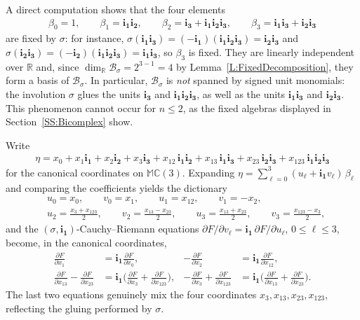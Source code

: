 \documentclass[12pt]{amsart}
\theoremstyle{plain}
\theoremstyle{definition}
\numberwithin{equation}{section}
\newcommand{\im}[1]{\mathbf{ i_{#1}}}
\newcommand{\mC}{\mathbb{C}}
\newcommand{\mR}{\mathbb{R}}
\newcommand{\mM}{\mathbb{M}}
\newcommand{\cB}{\mathcal{B}}
\begin{document}
A direct computation shows that the four elements
    \begin{align*}
    \beta_0 = 1 , \qquad \beta_1 = \im{1}\im{2} , \qquad \beta_2 = \im{3} + \im{1}\im{2}\im{3} , \qquad \beta_3 = \im{1}\im{3} + \im{2}\im{3}
    \end{align*}
are fixed by $\sigma$: for instance, $\sigma (\im{1}\im{3}) = (-\im{1})(\im{1}\im{2}\im{3}) = \im{2}\im{3}$ and $\sigma (\im{2}\im{3}) = (-\im{2})(\im{1}\im{2}\im{3}) = \im{1}\im{3}$, so $\beta_3$ is fixed. They are linearly independent over $\mR$ and, since $\dim_{\mR} \cB_\sigma = 2^{3-1} = 4$ by Lemma~\ref{L:FixedDecomposition}, they form a basis of $\cB_\sigma$. In particular, $\cB_\sigma$ is \emph{not} spanned by signed unit monomials: the involution $\sigma$ glues the units $\im{3}$ and $\im{1}\im{2}\im{3}$, as well as the units $\im{1}\im{3}$ and $\im{2}\im{3}$. This phenomenon cannot occur for $n \leq 2$, as the fixed algebras displayed in Section~\ref{SS:Bicomplex} show.

Write
    \begin{align*}
    \eta = x_0 + x_1 \im{1} + x_2 \im{2} + x_3 \im{3} + x_{12}\, \im{1}\im{2} + x_{13}\, \im{1}\im{3} + x_{23}\, \im{2}\im{3} + x_{123}\, \im{1}\im{2}\im{3}
    \end{align*}
for the canonical coordinates on $\mM \mC(3)$. Expanding $\eta = \sum_{\ell = 0}^{3} (u_\ell + \im{1} v_\ell )\, \beta_\ell$ and comparing the coefficients yields the dictionary
    \begin{align*}
    &u_0 = x_0 , \qquad v_0 = x_1 , \qquad u_1 = x_{12} , \qquad v_1 = - x_2 , \\
    &u_2 = \frac{x_3 + x_{123}}{2} , \qquad v_2 = \frac{x_{13} - x_{23}}{2} , \qquad u_3 = \frac{x_{13} + x_{23}}{2} , \qquad v_3 = \frac{x_{123} - x_3}{2},
    \end{align*}
and the $(\sigma , \im{1})$-Cauchy--Riemann equations $\partial F / \partial v_\ell = \im{1}\, \partial F / \partial u_\ell$, $0 \leq \ell \leq 3$, become, in the canonical coordinates,
    \begin{equation}\label{Eq:TricomplexSystem}
    \begin{aligned}
    \frac{\partial F}{\partial x_1} &= \im{1} \frac{\partial F}{\partial x_0} , &
    - \frac{\partial F}{\partial x_2} &= \im{1} \frac{\partial F}{\partial x_{12}} , \\
    \frac{\partial F}{\partial x_{13}} - \frac{\partial F}{\partial x_{23}} &= \im{1} \Big( \frac{\partial F}{\partial x_3} + \frac{\partial F}{\partial x_{123}} \Big) , &
    - \frac{\partial F}{\partial x_3} + \frac{\partial F}{\partial x_{123}} &= \im{1} \Big( \frac{\partial F}{\partial x_{13}} + \frac{\partial F}{\partial x_{23}} \Big).
    \end{aligned}
    \end{equation}
The last two equations genuinely mix the four coordinates $x_3 , x_{13}, x_{23}, x_{123}$, reflecting the gluing performed by $\sigma$.
\end{document}
